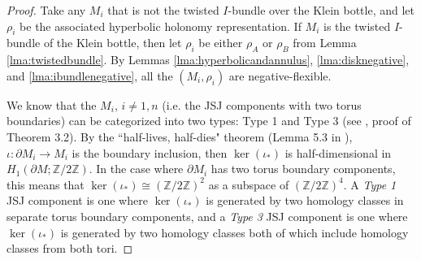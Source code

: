 \documentclass{article}
\theoremstyle{plain}
\theoremstyle{definition}
\theoremstyle{plain}
\theoremstyle{plain}
\theoremstyle{plain}
\theoremstyle{remark}
\theoremstyle{remark}
\theoremstyle{plain}
\theoremstyle{plain}
\begin{document}
\begin{proof}
Take any $M_i$ that is not the twisted $I$-bundle over the Klein bottle, and let $\rho_i$ be the associated hyperbolic holonomy representation. If $M_i$ is the twisted $I$-bundle of the Klein bottle, then let $\rho_i$ be either $\rho_A$ or $\rho_B$ from Lemma \ref{lma:twistedbundle}. By Lemmas \ref{lma:hyperbolicandannulus}, \ref{lma:disknegative}, and \ref{lma:ibundlenegative}, all the $(M_i, \rho_i)$ are negative-flexible. 

\medskip

We know that the $M_i$, $i \neq 1, n$ (i.e. the JSJ components with two torus boundaries) can be categorized into two types: Type 1 and Type 3 (see \cite{Wang}, proof of Theorem 3.2). By the ``half-lives, half-dies" theorem (Lemma 5.3 in \cite{Schleimer2018IntroductionTT}), $\iota: \partial M_i \to M_i$ is the boundary inclusion, then $\ker(\iota_*)$ is half-dimensional in $H_1(\partial M; \mathbb{Z}/2\mathbb{Z})$. In the case where $\partial M_i$ has two torus boundary components, this means that $\ker(\iota_*) \cong (\mathbb{Z}/2\mathbb{Z})^2$ as a subspace of $(\mathbb{Z}/2\mathbb{Z})^4$. A \emph{Type 1} JSJ component is one where $\ker(\iota_*)$ is generated by two homology classes in separate torus boundary components, and a \emph{Type 3} JSJ component is one where $\ker(\iota_*)$ is generated by two homology classes both of which include homology classes from both tori. 

\medskip


\end{proof}
\end{document}
